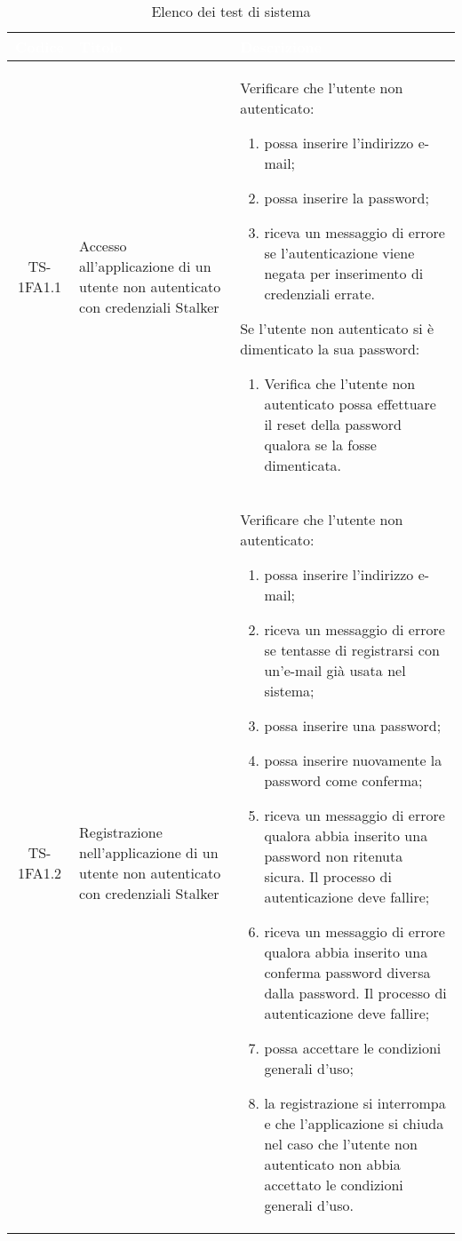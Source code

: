 {
\renewcommand{\arraystretch}{1.5}
\centering
\begin{longtable}{ c | C{3cm} | C{11cm} }
\caption{Elenco dei test di sistema}\\
\textcolor{white}{\textbf{Codice}} & \textcolor{white}{\textbf{Titolo}} & \textcolor{white}{\textbf{Descrizione}} \\
\hline
\endhead

TS-1FA1.1 & Accesso all'applicazione di un utente non autenticato con credenziali Stalker &
Verificare che l'utente non autenticato:
\begin{enumerate}
    \item possa inserire l'indirizzo e-mail;
    \item possa inserire la password;
    \item riceva un messaggio di errore se l'autenticazione viene negata per inserimento di credenziali errate.
\end{enumerate}
Se l'utente non autenticato si è dimenticato la sua password:
\begin{enumerate}
    \item Verifica che l'utente non autenticato possa effettuare il reset della password qualora se la fosse dimenticata.
\end{enumerate} \\

TS-1FA1.2 & Registrazione nell'applicazione di un utente non autenticato con credenziali Stalker &
Verificare che l'utente non autenticato:
\begin{enumerate}
    \item possa inserire l'indirizzo e-mail;
    \item riceva un messaggio di errore se tentasse di registrarsi con un'e-mail già usata nel sistema;
    \item possa inserire una password;
    \item possa inserire nuovamente la password come conferma;
    \item riceva un messaggio di errore qualora abbia inserito una password non ritenuta sicura. Il processo di autenticazione deve fallire;
    \item riceva un messaggio di errore qualora abbia inserito una conferma password diversa dalla password. Il processo di autenticazione deve fallire;
    \item possa accettare le condizioni generali d'uso;
    \item la registrazione si interrompa e che l'applicazione si chiuda nel caso che l'utente non autenticato non abbia accettato le condizioni generali d'uso.
\end{enumerate} \\


\end{longtable}}
